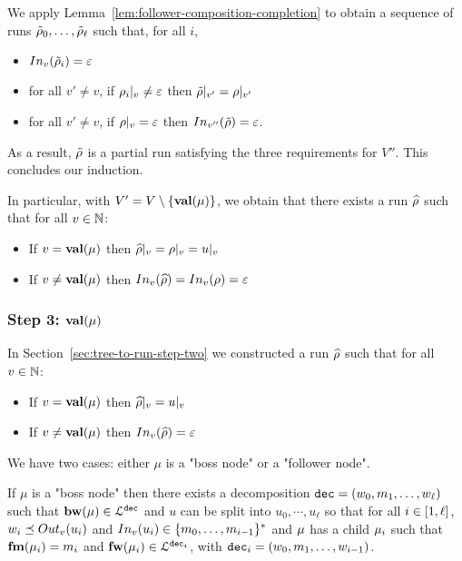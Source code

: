 We apply Lemma~\ref{lem:follower-composition-completion} to obtain a sequence of runs $\Tilde{\run}_0, \ldots, \Tilde{\run}_\ell$ such that, for all $i$, 
\begin{itemize}	
	\item $\vinput{v}{\Tilde{\run}_i} = \varepsilon$ 
	
	\item for all $v' \neq v$, if $\vproj{v}{\run_i} \neq \varepsilon$ then $\vproj{v'}{\Tilde{\run}} = \vproj{v'}{\run}$
	
	\item for all $v' \neq v$, if $\vproj{v}{\run} = \varepsilon$ then $\vinput{v''}{\Tilde{\run}} = \varepsilon$.
\end{itemize}

As a result, $\Tilde{\run}$ is a partial run satisfying the three requirements for $V''$.  This concludes our induction.

	In particular, with $V' = V\setminus \set{\valuelabel{\node}}$, we obtain that there exists a run $\widehat{\run}$ such that 
for all $v \in \nats$:
\begin{itemize}
	\item If $v = \valuelabel{\node}$ then $\vproj{v}{\widehat{\run}} = \vproj{v}{\run} = \vproj{v}{u}$
	
	\item If $v \neq \valuelabel{\node}$ then $\vinput{v}{\widehat{\run}} = \vinput{v}{\run} = \epsilon$
\end{itemize}  

\subsubsection{Step 3: $\valuelabel{\node}$}
	
In Section~\ref{sec:tree-to-run-step-two} we constructed a run $\widehat{\run}$ such that for all $v \in \nats$:
\begin{itemize}
	\item If $v = \valuelabel{\node}$ then $\vproj{v}{\widehat{\run}} = \vproj{v}{u}$
	
	\item If $v \neq \valuelabel{\node}$ then $\vinput{v}{\widehat{\run}} = \epsilon$
\end{itemize}  

We have two cases: either $\mu$ is a "boss node" or a "follower node".

If $\mu$ is a "boss node" then there exists a decomposition $\decsymb=(w_0, m_1, \ldots, w_\ell)$ such that $\bosslabel{\node} \in \langdec{\decsymb}$ and $u$ can be split into $u_0, \cdots, u_\ell$ so that for all $i \in \nset{1}{\ell}$, $w_i \subword \voutput{v}{u_i}$ and $\vinput{v}{u_i} \in \set{m_0, \ldots, m_{i-1}}^*$ and $\node$ has a child $\node_i$ such that $\followlabelmessage{\mu_i} = m_i$ and $\followlabelword{\node_i} \in \langdec{\decsymb_i}$, with $\decsymb_i = (w_0, m_1, \ldots, w_{i-1})$.

